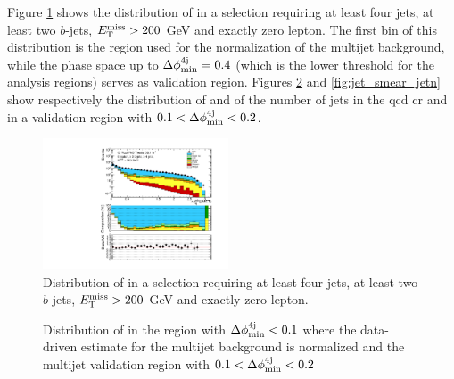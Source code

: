 Figure \ref{fig:jet_smear_dphi} shows the distribution of \dphimin in a selection requiring at least four jets, at least two $b$-jets, $E_{\rm T}^{\mathrm{miss}}>200$ GeV and exactly zero lepton. The first bin of this distribution is the region used for the normalization of the multijet background, 
while the phase space up to $\Delta\phi_{\rm{min}}^{4{\rm{j}}}=0.4$ (which is the lower threshold for the analysis regions) serves as validation region. 
Figures \ref{fig:jet_smear_met} and \ref{fig:jet_smear_jetn} show respectively the distribution of \met and of the number of jets in the \gls{qcd} \gls{cr} and in a validation region with $0.1 < \Delta\phi_{\rm{min}}^{4{\rm{j}}} < 0.2$.

\begin{figure}[h!]
\centering 
\includegraphics[width=0.49\textwidth]{figures/susy_common/jet_smearing/data_mc_dphi_min_QCD_noDphi.pdf}
\caption{Distribution of \dphimin in a selection requiring at least four jets, at least two $b$-jets, $E_{\rm T}^{\mathrm{miss}}>200$ GeV and exactly zero lepton.}\label{fig:jet_smear_dphi}
\end{figure}


\begin{figure}[h!]
\centering 
{}
\caption{Distribution of \met in  the region with $\Delta\phi_{\rm{min}}^{4{\rm{j}}} < 0.1$ where the data-driven estimate for the multijet background is normalized and  the multijet validation region with $0.1 < \Delta\phi_{\rm{min}}^{4{\rm{j}}} < 0.2$}\label{fig:jet_smear_met}
\end{figure}

